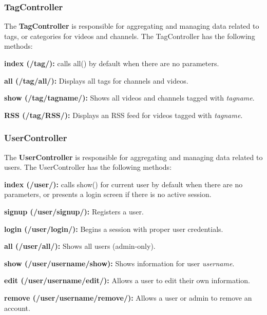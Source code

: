 \documentclass[a4paper,12pt]{report}
\begin{document}
\subsubsection{TagController}
The \textbf{TagController} is responsible for aggregating and managing data related to tags, or categories for videos and channels. The TagController has the following methods:
\begin{description}
\item{\textbf{index (/tag/): } calls all() by default when there are no parameters.}
\item{\textbf{all (/tag/all/): } Displays all tags for channels and videos.}
\item{\textbf{show (/tag/tagname/): } Shows all videos and channels tagged with \textit{tagname}.}
\item{\textbf{RSS (/tag/RSS/): } Displays an RSS feed for videos tagged with \textit{tagname}.} \\
\end{description} 

\subsubsection{UserController}
The \textbf{UserController} is responsible for aggregating and managing data related to users. The UserController has the following methods:
\begin{description}
\item{\textbf{index (/user/): } calls show() for current user by default when there are no parameters, or presents a login screen if there is no active session.}
\item{\textbf{signup (/user/signup/): } Registers a user.}
\item{\textbf{login (/user/login/): } Begins a session with proper user credentials.}
\item{\textbf{all (/user/all/): } Shows all users (admin-only).}
\item{\textbf{show (/user/username/show): } Shows information for user \textit{username}.}
\item{\textbf{edit (/user/username/edit/): } Allows a user to edit their own information.}
\item{\textbf{remove (/user/username/remove/): } Allows a user or admin to remove an account.} \\
\end{description}
\end{document}
